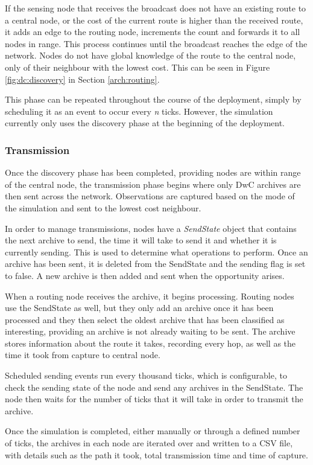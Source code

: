 	If the sensing node that receives the broadcast does not have an existing route to a central node, or the cost of the current route is higher than the received route, it adds an edge to the routing node, increments the count and forwards it to all nodes in range. This process continues until the broadcast reaches the edge of the network. Nodes do not have global knowledge of the route to the central node, only of their neighbour with the lowest cost. This can be seen in Figure \ref{fig:dc:discovery} in Section \ref{arch:routing}.
	
	This phase can be repeated throughout the course of the deployment, simply by scheduling it as an event to occur every \textit{n} ticks. However, the simulation currently only uses the discovery phase at the beginning of the deployment.
	
\subsubsection{Transmission}
	Once the discovery phase has been completed, providing nodes are within range of the central node, the transmission phase begins where only DwC archives are then sent across the network. Observations are captured based on the mode of the simulation and sent to the lowest cost neighbour.
	
	In order to manage transmissions, nodes have a \textit{SendState} object that contains the next archive to send, the time it will take to send it and whether it is currently sending. This is used to determine what operations to perform. Once an archive has been sent, it is deleted from the SendState and the sending flag is set to false. A new archive is then added and sent when the opportunity arises.
	
	When a routing node receives the archive, it begins processing. Routing nodes use the SendState as well, but they only add an archive once it has been processed and they then select the oldest archive that has been classified as interesting, providing an archive is not already waiting to be sent. The archive stores information about the route it takes, recording every hop, as well as the time it took from capture to central node.
	
	Scheduled sending events run every thousand ticks, which is configurable, to check the sending state of the node and send any archives in the SendState. The node then waits for the number of ticks that it will take in order to transmit the archive.
	
	Once the simulation is completed, either manually or through a defined number of ticks, the archives in each node are iterated over and written to a CSV file, with details such as the path it took, total transmission time and time of capture.


